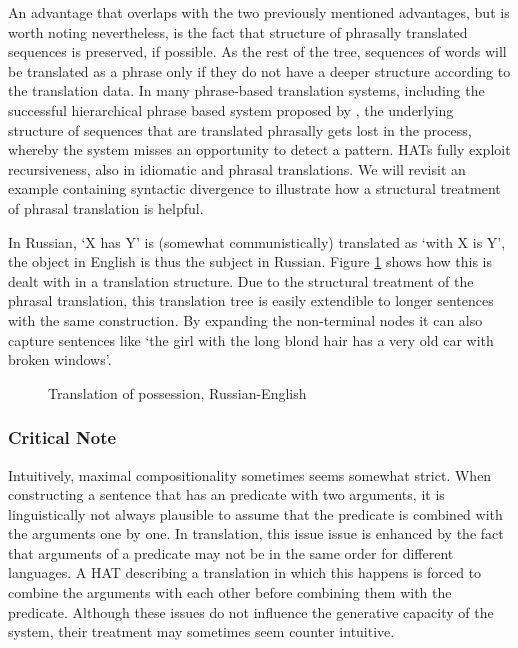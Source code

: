 An advantage that overlaps with the two previously mentioned advantages, but is worth noting nevertheless, is the fact that structure of phrasally translated sequences is preserved, if possible. As the rest of the tree, sequences of words will be translated as a phrase only if they do not have a deeper structure according to the translation data. In many phrase-based translation systems, including the successful hierarchical phrase based system proposed by \cite{chiang2007hierarchical}, the underlying structure of sequences that are translated phrasally gets lost in the process, whereby the system misses an opportunity to detect a pattern. HATs fully exploit recursiveness, also in idiomatic and phrasal translations. We will revisit an example containing syntactic divergence to illustrate how a structural treatment of phrasal translation is helpful.

In Russian, `X has Y' is (somewhat communistically) translated as `with X is Y', the object in English is thus the subject in Russian. Figure \ref{fig:russian1} shows how this is dealt with in a translation structure. Due to the structural treatment of the phrasal translation, this translation tree is easily extendible to longer sentences with the same construction. By expanding the non-terminal nodes it can also capture sentences like `the girl with the long blond hair has a very old car with broken windows'.

\begin{figure}[!ht]
\centering

\caption{Translation of possession, Russian-English}\label{fig:russian1}
\end{figure}


\subsubsection{Critical Note}

Intuitively, maximal compositionality sometimes seems somewhat strict. When constructing a sentence that has an predicate with two arguments, it is linguistically not always plausible to assume that the predicate is combined with the arguments one by one. In translation, this issue issue is enhanced by the fact that arguments of a predicate may not be in the same order for different languages. A HAT describing a translation in which this happens is forced to combine the arguments with each other before combining them with the predicate. Although these issues do not influence the generative capacity of the system, their treatment may sometimes seem counter intuitive.


